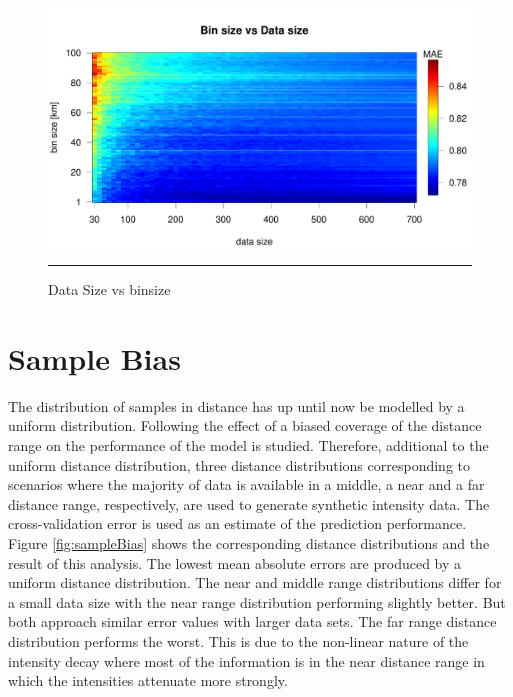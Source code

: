 \begin{figure}[!htpb]
	\centering
		\includegraphics[scale=0.33]{Figures/binsizeDatasize.pdf}
		\rule{35em}{0.5pt}
	\caption[Data Size vs binsize]{Data Size vs binsize}
	\label{fig:binsizeData}
\end{figure}

\section{Sample Bias}
The distribution of samples in distance has up until now be modelled by a uniform distribution. Following the effect of a biased coverage of the distance range on the performance of the model is studied. Therefore, additional to the uniform distance distribution, three distance distributions corresponding to scenarios where the majority of data is available in a middle, a near and a far distance range, respectively, are used to generate synthetic intensity data. The cross-validation error is used as an estimate of the prediction performance.\\
Figure \ref{fig:sampleBias} shows the corresponding distance distributions and the result of this analysis. The lowest mean absolute errors are produced by a uniform distance distribution. The near and middle range distributions differ for a small data size with the near range distribution performing slightly better. But both approach similar error values with larger data sets. The far range distance distribution performs the worst. This is due to the non-linear nature of the intensity decay where most of the information is in the near distance range in which the intensities attenuate more strongly.

